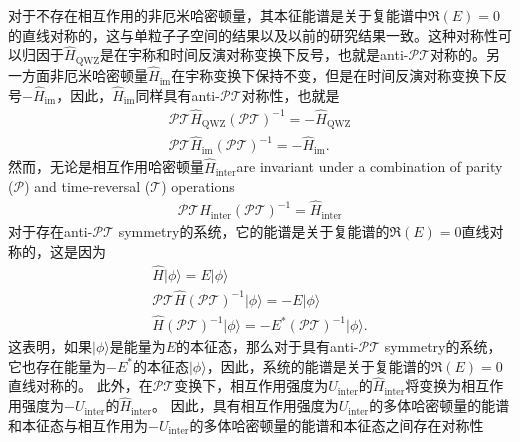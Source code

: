 \documentclass[longbibliography, aps, prx, amsmath, amssymb, amsfonts, twocolumn,superscriptaddress, footinbib]{revtex4-1}
\begin{document}
	对于不存在相互作用的非厄米哈密顿量，其本征能谱是关于复能谱中$\Re(E)=0$的直线对称的，这与单粒子子空间的结果以及以前的研究结果一致。这种对称性可以归因于$\hat{H}_{\text{QWZ}}$是在宇称和时间反演对称变换下反号，也就是anti-$\mathcal{PT}$对称的。另一方面非厄米哈密顿量$\hat{H}_{\text{im}}$在宇称变换下保持不变，但是在时间反演对称变换下反号$-\hat{H}_{\text{im}}$，因此，$\hat{H}_{\text{im}}$同样具有anti-$\mathcal{PT}$对称性，也就是
	\begin{equation}
		\begin{split}
			\mathcal{PT} \hat{H}_{\text{QWZ}} (\mathcal{PT})^{-1} = -\hat{H}_{\text{QWZ}} \\
			\mathcal{PT} \hat{H}_{\text{im}} (\mathcal{PT})^{-1} = -\hat{H}_{\text{im}}.
		\end{split}
	\end{equation}
	然而，无论是相互作用哈密顿量$\hat{H}_{\text{inter}}$are invariant under a combination of parity ($\mathcal{P}$) and time-reversal ($\mathcal{T}$) operations
	\begin{equation}
		\begin{split}
			\mathcal{PT} \hat{H}_{\text{inter}} (\mathcal{PT})^{-1} = \hat{H}_{\text{inter}}%
		\end{split}
	\end{equation}
	对于存在anti-$\mathcal{PT}$ symmetry的系统，它的能谱是关于复能谱的$\Re(E)=0$直线对称的，这是因为
	\begin{equation}
		\begin{split}
			\hat{H} \vert \phi \rangle = E \vert \phi \rangle\\
			\mathcal{PT} \hat{H} (\mathcal{PT})^{-1} \vert \phi \rangle = - E \vert \phi \rangle\\
			\hat{H} (\mathcal{PT})^{-1} \vert \phi \rangle = - E^* (\mathcal{PT})^{-1} \vert \phi \rangle.
		\end{split}
	\end{equation}
	这表明，如果$\vert \phi \rangle$是能量为$E$的本征态，那么对于具有anti-$\mathcal{PT}$ symmetry的系统，它也存在能量为$-E^*$的本征态$\vert \phi \rangle$，因此，系统的能谱是关于复能谱的$\Re(E)=0$直线对称的。
	此外，在$\mathcal{PT}$变换下，相互作用强度为$U_{\text{inter}}$的$\hat{H}_{\text{inter}}$将变换为相互作用强度为$-U_{\text{inter}}$的$\hat{H}_{\text{inter}}$。
	因此，具有相互作用强度为$U_{\text{inter}}$的多体哈密顿量的能谱和本征态与相互作用为$-U_{\text{inter}}$的多体哈密顿量的能谱和本征态之间存在对称性
\end{document}
